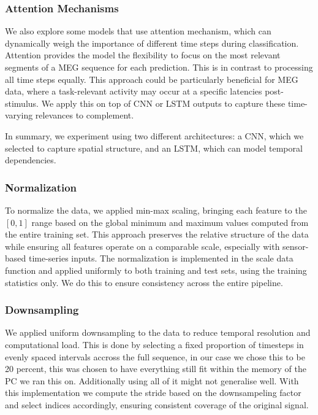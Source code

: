 \documentclass[conference]{IEEEtran}
\begin{document}
\subsubsection{Attention Mechanisms}
We also explore some models that use attention mechanism, which can dynamically weigh the importance of different time steps during classification. Attention provides the model the flexibility to focus on the most relevant segments of a MEG sequence for each prediction. This is in contrast to processing all time steps equally. This approach could be particularly beneficial for MEG data, where a task-relevant activity may occur at a specific latencies post-stimulus. We apply this on top of CNN or LSTM outputs to capture these time-varying relevances to complement.

In summary, we experiment using two different architectures: a CNN, which we selected to capture spatial structure, and an LSTM, which can model temporal dependencies. 

\subsubsection{Normalization}
To normalize the data, we applied min-max scaling, bringing each feature to the $[0,1]$ range based on the global minimum and maximum values computed from the entire training set.
 This approach preserves the relative structure of the data while ensuring all features operate on a comparable scale, especially with sensor-based time-series inputs.
The normalization is implemented in the scale data function and applied uniformly to both training and test sets, using the training statistics only. We do this to ensure consistency across the entire pipeline.

\subsubsection{Downsampling}
We applied uniform downsampling to the data to reduce temporal resolution and computational load. 
This is done by selecting a fixed proportion of timesteps in evenly spaced intervals accross the full sequence, in our case we chose this to be 20 percent, this was chosen to have everything still fit within the memory of the PC we ran this on. Additionally using all of it might not generalise well. With this implementation we compute the stride based on the downsampeling factor and select indices accordingly, ensuring consistent coverage of the original signal. 
\end{document}

